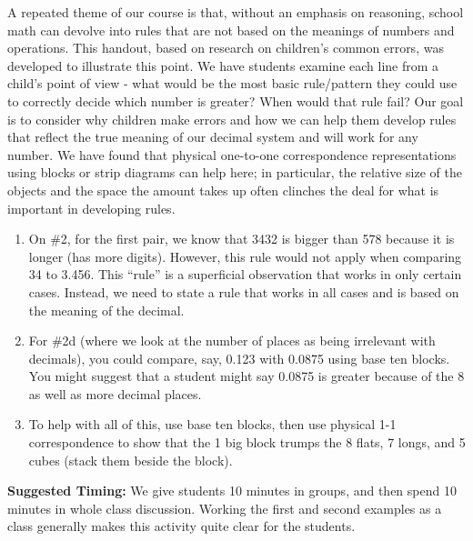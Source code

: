 \documentclass[nooutcomes,noauthor,handout]{ximera}
\begin{document}
\newpage
\begin{instructorNotes}
A repeated theme of our course is that, without an emphasis on reasoning, school math can devolve into rules that are not based on the meanings of numbers and operations.  This handout, based on research on children's common errors, was developed to illustrate this point.  We have students examine each line from a child's point of view - what would be the most basic rule/pattern they could use to correctly decide which number is greater? When would that rule fail? Our goal is to consider why children make errors and how we can help them develop rules that reflect the true meaning of our decimal system and will work for any number.  We have found that physical one-to-one correspondence representations using blocks or strip diagrams can help here; in particular, the relative size of the objects and the space the amount takes up often clinches the deal for what is important in developing rules.

\begin{enumerate}
 	\item On \#2, for the first pair, we know that 3432 is bigger than 578 because it is longer (has more digits).   However, this rule would not apply when comparing 34 to 3.456.  This ``rule'' is a superficial observation that works in only certain cases.  Instead, we need to state a rule that works in all cases and is based on the meaning of the decimal.
 	\item For \#2d (where we look at the number of places as being irrelevant with decimals), you could compare, say, 0.123 with 0.0875 using base ten blocks.  You might suggest that a student might say 0.0875 is greater because of the 8 as well as more decimal places.
 	\item To help with all of this, use base ten blocks, then use physical 1-1 correspondence to show that the 1 big block trumps the 8 flats, 7 longs, and 5 cubes (stack them beside the block).  
 \end{enumerate}

{\bf Suggested Timing:} We give students 10 minutes in groups, and then spend 10 minutes in whole class discussion.  Working the first and second examples as a class generally makes this activity quite clear for the students.
\end{instructorNotes}
\end{document}
